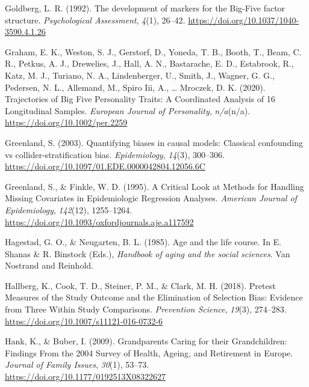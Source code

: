 \documentclass[
  english,
  man, noextraspace]{apa7}
\begin{document}
\leavevmode\hypertarget{ref-goldbergDevelopmentMarkersBigFive1992}{}%
Goldberg, L. R. (1992). The development of markers for the Big-Five factor structure. \emph{Psychological Assessment}, \emph{4}(1), 26--42. \url{https://doi.org/10.1037/1040-3590.4.1.26}

\leavevmode\hypertarget{ref-grahamTrajectoriesBigFive2020}{}%
Graham, E. K., Weston, S. J., Gerstorf, D., Yoneda, T. B., Booth, T., Beam, C. R., Petkus, A. J., Drewelies, J., Hall, A. N., Bastarache, E. D., Estabrook, R., Katz, M. J., Turiano, N. A., Lindenberger, U., Smith, J., Wagner, G. G., Pedersen, N. L., Allemand, M., Spiro Iii, A., \ldots{} Mroczek, D. K. (2020). Trajectories of Big Five Personality Traits: A Coordinated Analysis of 16 Longitudinal Samples. \emph{European Journal of Personality}, \emph{n/a}(n/a). \url{https://doi.org/10.1002/per.2259}

\leavevmode\hypertarget{ref-greenlandQuantifyingBiasesCausal2003}{}%
Greenland, S. (2003). Quantifying biases in causal models: Classical confounding vs collider-stratification bias. \emph{Epidemiology}, \emph{14}(3), 300--306. \url{https://doi.org/10.1097/01.EDE.0000042804.12056.6C}

\leavevmode\hypertarget{ref-greenlandCriticalLookMethods1995}{}%
Greenland, S., \& Finkle, W. D. (1995). A Critical Look at Methods for Handling Missing Covariates in Epidemiologic Regression Analyses. \emph{American Journal of Epidemiology}, \emph{142}(12), 1255--1264. \url{https://doi.org/10.1093/oxfordjournals.aje.a117592}

\leavevmode\hypertarget{ref-hagestadAgeLifeCourse1985}{}%
Hagestad, G. O., \& Neugarten, B. L. (1985). Age and the life course. In E. Shanas \& R. Binstock (Eds.), \emph{Handbook of aging and the social sciences}. Van Nostrand and Reinhold.

\leavevmode\hypertarget{ref-hallbergPretestMeasuresStudy2018}{}%
Hallberg, K., Cook, T. D., Steiner, P. M., \& Clark, M. H. (2018). Pretest Measures of the Study Outcome and the Elimination of Selection Bias: Evidence from Three Within Study Comparisons. \emph{Prevention Science}, \emph{19}(3), 274--283. \url{https://doi.org/10.1007/s11121-016-0732-6}

\leavevmode\hypertarget{ref-hankGrandparentsCaringTheir2009}{}%
Hank, K., \& Buber, I. (2009). Grandparents Caring for their Grandchildren: Findings From the 2004 Survey of Health, Ageing, and Retirement in Europe. \emph{Journal of Family Issues}, \emph{30}(1), 53--73. \url{https://doi.org/10.1177/0192513X08322627}
\end{document}
